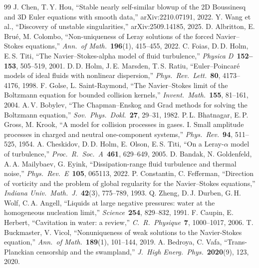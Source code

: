 \documentclass[11pt,a4paper]{article}
\begin{document}
\begin{thebibliography}{99}
  J. Chen, T.\,Y. Hou,
  ``Stable nearly self-similar blowup of the 2D Boussinesq and 3D Euler equations with smooth
  data,'' arXiv:2210.07191, 2022.
  Y. Wang et al.,
  ``Discovery of unstable singularities,'' arXiv:2509.14185, 2025.
  D. Albritton, E. Bru\'e, M. Colombo,
  ``Non-uniqueness of Leray solutions of the forced Navier--Stokes equations,''
  \emph{Ann.\ of Math.}\ \textbf{196}(1), 415--455, 2022.
  C. Foias, D.\,D. Holm, E.\,S. Titi,
  ``The Navier--Stokes-alpha model of fluid turbulence,''
  \emph{Physica D}\ \textbf{152--153}, 505--519, 2001.
  D.\,D. Holm, J.\,E. Marsden, T.\,S. Ratiu,
  ``Euler--Poincar\'e models of ideal fluids with nonlinear dispersion,''
  \emph{Phys.\ Rev.\ Lett.}\ \textbf{80}, 4173--4176, 1998.
  F. Golse, L. Saint-Raymond,
  ``The Navier--Stokes limit of the Boltzmann equation for bounded collision kernels,''
  \emph{Invent.\ Math.}\ \textbf{155}, 81--161, 2004.
  A.\,V. Bobylev,
  ``The Chapman--Enskog and Grad methods for solving the Boltzmann equation,''
  \emph{Sov.\ Phys.\ Dokl.}\ \textbf{27}, 29--31, 1982.
  P.\,L. Bhatnagar, E.\,P. Gross, M. Krook,
  ``A model for collision processes in gases. I. Small amplitude processes in charged and neutral
  one-component systems,'' \emph{Phys.\ Rev.}\ \textbf{94}, 511--525, 1954.
  A. Cheskidov, D.\,D. Holm, E. Olson, E.\,S. Titi,
  ``On a Leray-$\alpha$ model of turbulence,''
  \emph{Proc.\ R.\ Soc.\ A}\ \textbf{461}, 629--649, 2005.
  D. Bandak, N. Goldenfeld, A.\,A. Mailybaev, G. Eyink,
  ``Dissipation-range fluid turbulence and thermal noise,''
  \emph{Phys.\ Rev.\ E}\ \textbf{105}, 065113, 2022.
  P. Constantin, C. Fefferman,
  ``Direction of vorticity and the problem of global regularity for the Navier--Stokes equations,''
  \emph{Indiana Univ.\ Math.\ J.}\ \textbf{42}(3), 775--789, 1993.
  Q. Zheng, D.\,J. Durben, G.\,H. Wolf, C.\,A. Angell,
  ``Liquids at large negative pressures: water at the homogeneous nucleation limit,''
  \emph{Science}\ \textbf{254}, 829--832, 1991.
  F. Caupin, E. Herbert,
  ``Cavitation in water: a review,''
  \emph{C.\ R.\ Physique}\ \textbf{7}, 1000--1017, 2006.
  T. Buckmaster, V. Vicol,
  ``Nonuniqueness of weak solutions to the Navier-Stokes equation,''
  \emph{Ann.\ of Math.}\ \textbf{189}(1), 101--144, 2019.
  A. Bedroya, C. Vafa,
  ``Trans-Planckian censorship and the swampland,''
  \emph{J.\ High Energ.\ Phys.}\ \textbf{2020}(9), 123, 2020.
\end{thebibliography}
\end{document}
